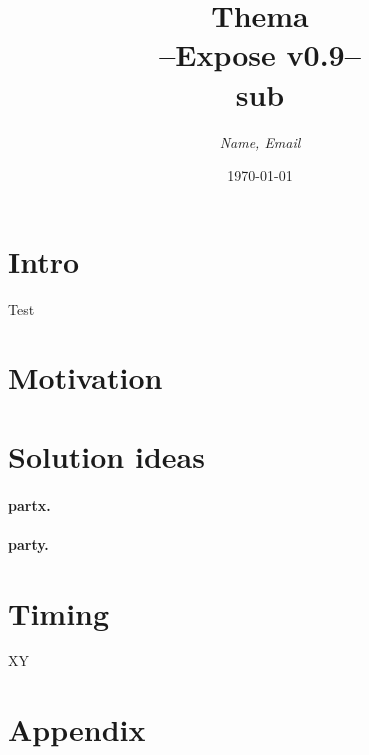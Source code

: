 \documentclass[ngerman,a4paper,10pt]{scrartcl}
\title{\color{darkblue}
    Thema \\[0.5em]
    {\normalsize
    --Expose v0.9--    \\
    sub
    }
}
\author{\color{lightgray} \textit{Name, Email} }
\date{\color{lightgray}\today}
\newcommand{\hide}[1]{}
\begin{document}
\maketitle

\section{Intro}
Test \cite{Berlin}


\section{Motivation}

\section{Solution ideas}
\paragraph{partx.}

\paragraph{party.}

\section{Timing}
XY


\section{Appendix} \label{sec:appendixlabel}


%


    \clearpage

\end{document}
